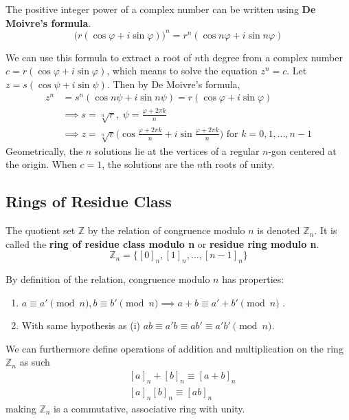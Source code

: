 \documentclass{article}
\begin{document}
      \begin{corollary}
        The positive integer power of a complex number can be written using \textbf{De Moivre's formula}. 
        \begin{equation}
          \big(r(\cos{\varphi} + i \sin{\varphi})\big)^n = r^n (\cos{n \varphi} + i \sin{n \varphi})
        \end{equation}
      \end{corollary}

      We can use this formula to extract a root of $n$th degree from a complex number $c = r(\cos{\varphi} + i \sin{\varphi})$, which means to solve the equation $z^n = c$. Let $z = s (\cos{\psi} + i \sin{\psi})$. Then by De Moivre's formula, 
      \begin{align*}
        z^n & = s^n (\cos{n \psi} + i \sin{n \psi}) = r(\cos{\varphi} + i \sin{\varphi}) \\
        & \implies s = \sqrt[n]{r}, \; \psi = \frac{\varphi + 2\pi k}{n} \\
        & \implies z = \sqrt[n]{r} \bigg( \cos{\frac{\varphi + 2\pi k}{n}} + i \sin{\frac{\varphi + 2\pi k}{n}}\bigg) \text{ for } k = 0, 1, ..., n-1
      \end{align*}
      Geometrically, the $n$ solutions lie at the vertices of a regular $n$-gon centered at the origin. When $c = 1$, the solutions are the $n$th roots of unity.

  \subsection{Rings of Residue Class}

    \begin{definition}
      The quotient set $\mathbb{Z}$ by the relation of congruence modulo $n$ is denoted $\mathbb{Z}_{n}$. It is called the \textbf{ring of residue class modulo n} or \textbf{residue ring modulo n}. 
      \begin{equation}
        \mathbb{Z}_{n} = \{ [0]_{n}, [1]_{n}, ... , [n-1]_{n} \}
      \end{equation}
    \end{definition}

    By definition of the relation, congruence modulo $n$ has properties: 
    \begin{enumerate}
      \item $a \equiv a' \pmod{n}, b \equiv b' \pmod{n} \implies a + b \equiv a' + b' \pmod{n}$ . 
      \item With same hypothesis as (i) $a b \equiv a' b \equiv a b' \equiv a' b' \pmod{n}$. 
    \end{enumerate}
    We can furthermore define operations of addition and multiplication on the ring $\mathbb{Z}_{n}$ as such 
    \begin{align*}
      & [a]_{n} + [b]_{n} \equiv [a + b]_{n} \\
      & [a]_{n} [b]_{n} \equiv [ab]_{n}
    \end{align*}
    making $\mathbb{Z}_{n}$ is a commutative, associative ring with unity. 
\end{document}
